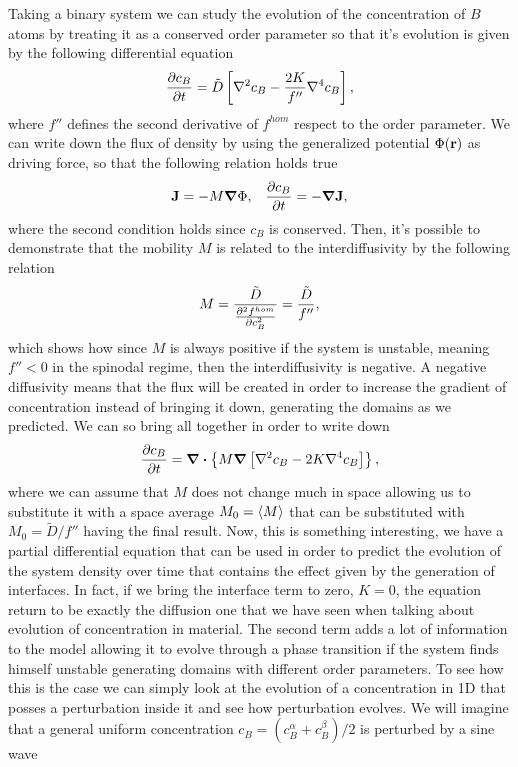 {
    Taking a binary system we can study the evolution of the concentration of $B$ atoms by treating it as a conserved order parameter so that it's evolution is given by the following differential equation
    \begin{equation}
        \pdv{c_B}{t} = \tilde{D}\left[ \laplacian c_B - \frac{2K}{f''}\nabla^4 c_B \right],
    \end{equation}
    where $f''$ defines the second derivative of $f^{hom}$ respect to the order parameter.
}
{
    We can write down the flux of density by using the generalized potential $\Phi(\vb{r})$ as driving force, so that the following relation holds true
    \begin{align}
        &\vb{J} = -M\grad \Phi, &\pdv{c_B}{t} = -\grad\vb{J},
    \end{align}
    where the second condition holds since $c_B$ is conserved. Then, it's possible to demonstrate that the mobility $M$ is related to the interdiffusivity by the following relation
    \begin{equation}
        M = \frac{\tilde{D}}{\pdv[2]{f^{hom}}{c_B}} = \frac{\tilde{D}}{f''},
    \end{equation}
    which shows how since $M$ is always positive if the system is unstable, meaning $f'' < 0$ in the spinodal regime, then the interdiffusivity is negative. A negative diffusivity means that the flux will be created in order to increase the gradient of concentration instead of bringing it down, generating the domains as we predicted. We can so bring all together in order to write down
    \begin{equation}
        \pdv{c_B}{t} = \grad\vdot\left\{ M\grad\left[ \laplacian c_B - 2K\nabla^4 c_B \right] \right\},
    \end{equation}
    where we can assume that $M$ does not change much in space allowing us to substitute it with a space average $M_0 = \left\langle M \right\rangle$ that can be substituted with $M_0 = \tilde{D}/f''$ having the final result.
}
\noindent
Now, this is something interesting, we have a partial differential equation that can be used in order to predict the evolution of the system density over time that contains the effect given by the generation of interfaces. In fact, if we bring the interface term to zero, $K = 0$, the equation return to be exactly the diffusion one that we have seen when talking about evolution of concentration in material. The second term adds a lot of information to the model allowing it to evolve through a phase transition if the system finds himself unstable generating domains with different order parameters. To see how this is the case we can simply look at the evolution of a concentration in 1D that posses a perturbation inside it and see how perturbation evolves. We will imagine that a general uniform concentration $c_B = (c_B^\alpha + c_B^\beta)/2$ is perturbed by a sine wave 
